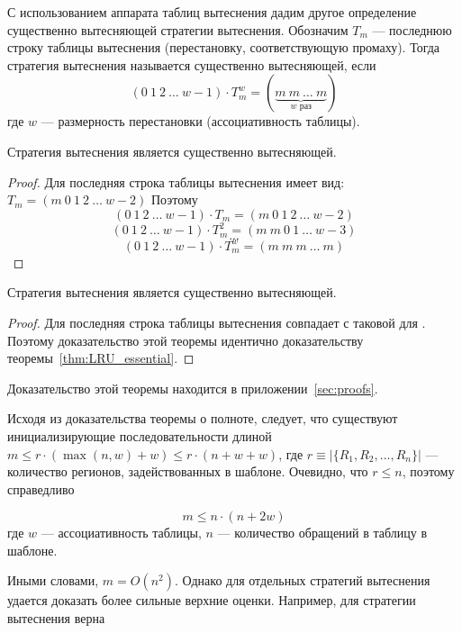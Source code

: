 С использованием аппарата таблиц вытеснения дадим другое определение существенно вытесняющей стратегии вытеснения. Обозначим $T_m$ --- последнюю строку таблицы вытеснения (перестановку, соответствующую промаху). Тогда стратегия вытеснения называется существенно вытесняющей, если $$(0~1~2~\dots~w{-}1) \cdot T_m^w = (\underbrace{m~m~\dots~m}_{\mbox{$w$~раз}})$$ где $w$ --- размерность перестановки (ассоциативность таблицы).

\begin{theorem}\label{thm:LRU_essential}
  Стратегия вытеснения \LRU является существенно вытесняющей.
\end{theorem}
\begin{proof}
  Для \LRU последняя строка таблицы вытеснения имеет вид: $T_m = (m~0~1~2~\dots~w{-}2)$ Поэтому
  $$(0~1~2~\dots~w{-}1) \cdot T_m = (m~0~1~2~\dots~w{-}2)$$
  $$(0~1~2~\dots~w{-}1) \cdot T_m^2 = (m~m~0~1~\dots~w{-}3)$$
  $$\mbox{...}$$
  $$(0~1~2~\dots~w{-}1) \cdot T_m^w = (m~m~m~\dots~m)$$
\end{proof}

\begin{theorem}
  Стратегия вытеснения \FIFO является существенно вытесняющей.
\end{theorem}
\begin{proof}
  Для \FIFO последняя строка таблицы вытеснения совпадает с таковой для \LRU. Поэтому доказательство этой теоремы идентично доказательству теоремы~\ref{thm:LRU_essential}.
\end{proof}

\begin{theorem}\label{thm:PseudoLRU_essential} \PseudoLRUEssential \end{theorem}

Доказательство этой теоремы находится в приложении~\ref{sec:proofs}.

Исходя из доказательства теоремы о полноте, следует, что существуют инициализирующие последовательности длиной $m \leqslant r \cdot (\max(n,w) + w) \leqslant r \cdot (n + w + w)$, где $r \equiv |\{R_1, R_2, ..., R_n\}|$ --- количество регионов, задействованных в шаблоне. Очевидно, что $r \leqslant n$, поэтому справедливо

\begin{utv}
$$m \leqslant n \cdot (n + 2w)$$
где $w$ --- ассоциативность таблицы, $n$ --- количество обращений в таблицу в шаблоне.
\end{utv}

Иными словами, $m = O(n^2)$. Однако для отдельных стратегий вытеснения удается доказать более сильные верхние оценки. Например, для стратегии вытеснения \LRU верна

